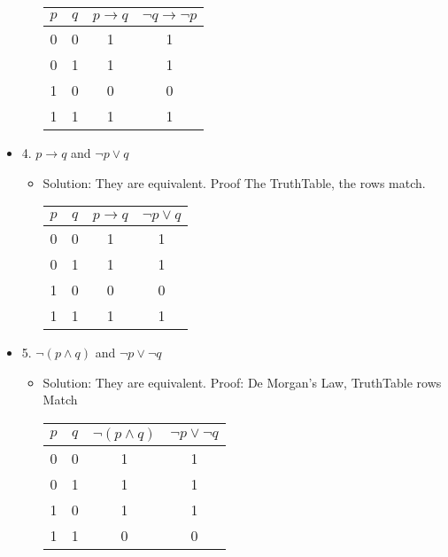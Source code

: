 \documentclass[11pt]{article}
\begin{document}
\begin{itemize}
\begin{itemize}
\begin{tabular}{|c|c|c|c|}
\hline
$p$ & $q$ & $p \to q$ & $ \lnot q \to  \lnot p$ \\
\hline
0 & 0 & 1 & 1 \\
0 & 1 & 1 & 1 \\
1 & 0 & 0 & 0 \\
1 & 1 & 1 & 1 \\
\hline
\end{tabular}

 \end{itemize} 
 
\item 4. $p \to q $ and $ \neg p \vee q $

\begin{itemize}
\item Solution: They are equivalent. Proof The TruthTable, the rows match.

\begin{tabular}{|c|c|c|c|}
\hline
$p$ & $q$ & $p \to q$ & $ \lnot p \lor q$ \\
\hline
0 & 0 & 1 & 1 \\
0 & 1 & 1 & 1 \\
1 & 0 & 0 & 0 \\
1 & 1 & 1 & 1 \\
\hline
\end{tabular}

 \end{itemize} 
 
\item 5. $ \neg (p \wedge q) $ and $ \neg p \vee  \neg q $

\begin{itemize}
\item Solution: They are equivalent. Proof: De Morgan's Law, TruthTable rows Match 

\begin{tabular}{|c|c|c|c|}
\hline
$p$ & $q$ & $ \lnot (p \land q)$ & $ \lnot p \lor  \lnot q$ \\
\hline
0 & 0 & 1 & 1 \\
0 & 1 & 1 & 1 \\
1 & 0 & 1 & 1 \\
1 & 1 & 0 & 0 \\
\hline
\end{tabular}

 \end{itemize} 
 
\end{itemize}
\end{document}
